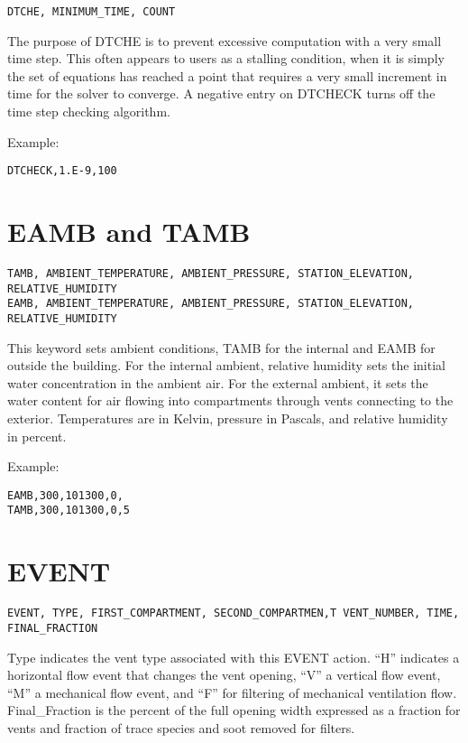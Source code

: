 \begin{lstlisting}
DTCHE, MINIMUM_TIME, COUNT
\end{lstlisting}

The purpose of DTCHE is to prevent excessive computation with a very small time step. This often appears to users as a stalling condition, when it is simply the set of equations has reached a point that requires a very small increment in time for the solver to converge. A negative entry on DTCHECK turns off the time step checking algorithm.

Example:

\begin{lstlisting}
DTCHECK,1.E-9,100
\end{lstlisting}

\section{EAMB and TAMB}

\begin{lstlisting}
TAMB, AMBIENT_TEMPERATURE, AMBIENT_PRESSURE, STATION_ELEVATION, RELATIVE_HUMIDITY
EAMB, AMBIENT_TEMPERATURE, AMBIENT_PRESSURE, STATION_ELEVATION, RELATIVE_HUMIDITY
\end{lstlisting}

This keyword sets ambient conditions, TAMB for the internal and EAMB for outside the building. For the internal ambient, relative humidity sets the initial water concentration in the ambient air.  For the external ambient, it sets the water content for air flowing into compartments through vents connecting to the exterior. Temperatures are in Kelvin, pressure in Pascals, and relative humidity in percent.

Example:

\begin{lstlisting}
EAMB,300,101300,0,
TAMB,300,101300,0,5
\end{lstlisting}

\section{EVENT}

\begin{lstlisting}
EVENT, TYPE, FIRST_COMPARTMENT, SECOND_COMPARTMEN,T VENT_NUMBER, TIME, FINAL_FRACTION
\end{lstlisting}

Type indicates the vent type associated with this EVENT action. ``H'' indicates a horizontal flow event that changes the vent opening, ``V'' a vertical flow event, ``M'' a mechanical flow event, and ``F'' for filtering of mechanical ventilation flow.  Final\_Fraction is the percent of the full opening width expressed as a fraction for vents and fraction of trace species and soot removed for filters.

